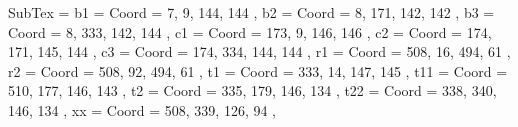 SubTex = {
	b1								= { Coord = { 7, 9, 144, 144 } },
	b2								= { Coord = { 8, 171, 142, 142 } },
	b3								= { Coord = { 8, 333, 142, 144 } },
	c1								= { Coord = { 173, 9, 146, 146 } },
	c2								= { Coord = { 174, 171, 145, 144 } },
	c3								= { Coord = { 174, 334, 144, 144 } },
	r1								= { Coord = { 508, 16, 494, 61 } },
	r2								= { Coord = { 508, 92, 494, 61 } },
	t1								= { Coord = { 333, 14, 147, 145 } },
	t11								= { Coord = { 510, 177, 146, 143 } },
	t2								= { Coord = { 335, 179, 146, 134 } },
	t22								= { Coord = { 338, 340, 146, 134 } },
	xx								= { Coord = { 508, 339, 126, 94 } },
}
